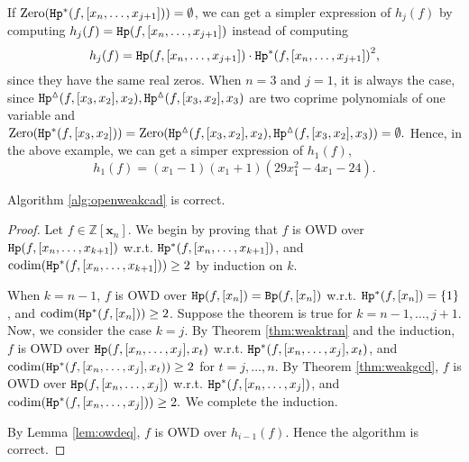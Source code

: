 \documentclass[amsthm]{elsart}
\def \codim {{\rm codim}}
\def \Bproj  {{\tt Bp}}
\def  \zero {{\rm Zero}}
\def  \Hproj {{\tt Hp}}
\def \ZZ {{\mathbb Z}}
\newcommand{\xx}{\bm{x}}
\begin{document}
\begin{rem}
  If $\zero({\Hproj^{\ast}(f,[x_n,\ldots,x_{j+1}])})=\emptyset$, we can get a simpler expression of $h_j(f)$ by computing $h_j(f)=\Hproj(f,[x_n,\ldots,x_{j+1}])$ instead of computing $$h_j(f)=\Hproj(f,[x_n,\ldots,x_{j+1}])\cdot{\Hproj^{\ast}(f,[x_n,\ldots,x_{j+1}])}^2,$$ since they have the same real zeros. When $n=3$ and $j=1$, it is always the case, since ${\Hproj^{\vartriangle}(f,[x_3,x_2],x_2)},{\Hproj^{\vartriangle}(f,[x_3,x_2],x_3)}$ are two coprime polynomials of one variable and $\zero({\Hproj^{\ast}(f,[x_3,x_{2}])})=\zero({\Hproj^{\vartriangle}(f,[x_3,x_2],x_2)},{\Hproj^{\vartriangle}(f,[x_3,x_2],x_3)})=\emptyset.$ Hence, in the above example, we can get a simper expression of $h_1(f)$,
  $$h_1(f) =(x_1-1)(x_1+1)(29x_1^2-4x_1-24).$$
\end{rem}
\begin{thm}[Correctness]\label{thm:openweakcad} Algorithm \ref{alg:openweakcad} is correct.
\end{thm}
\begin{proof}
Let $f\in\ZZ[\xx_n]$. We begin by proving that  $f$ is OWD over $\Hproj(f,[x_n,\ldots,x_{k+1}])$ w.r.t. ${\Hproj^{\ast}(f,[x_n,\ldots,x_{k+1}])}$, and $\codim({\Hproj^{\ast}(f,[x_n,\ldots,x_{k+1}])})\ge2$ by induction on $k$.

When $k=n-1$, $f$ is OWD over $\Hproj(f,[x_n])=\Bproj(f,[x_n])$ w.r.t. ${\Hproj^{\ast}(f,[x_n])}=\{1\}$, and $\codim({\Hproj^{\ast}(f,[x_n])})\ge2$.  Suppose the theorem is true for $k=n-1,\ldots,j+1$. Now, we consider the case $k=j$. By Theorem \ref{thm:weaktran} and the induction, $f$ is OWD over $\Hproj(f,[x_n,\ldots,x_{j}],x_t)$ w.r.t. ${\Hproj^{\ast}(f,[x_n,\ldots,x_{j}],x_t)}$, and $\codim({\Hproj^{\ast}(f,[x_n,\ldots,x_{j}],x_t)})\ge2$ for $t=j,\ldots,n$. By Theorem \ref{thm:weakgcd}, $f$ is OWD over $\Hproj(f,[x_n,\ldots,x_{j}])$ w.r.t. ${\Hproj^{\ast}(f,[x_n,\ldots,x_{j}])}$, and $\codim({\Hproj^{\ast}(f,[x_n,\ldots,x_{j}])})\ge2.$ We complete the induction.

By Lemma \ref{lem:owdeq}, $f$ is OWD over $h_{i-1}(f)$.
Hence the algorithm is correct.
\end{proof}
\end{document}
